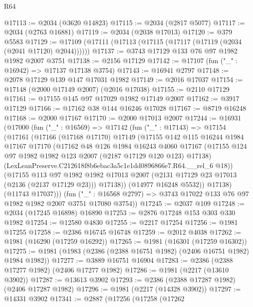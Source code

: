 \begin{lexlean}{R64}
\begin{coremodule}
@17113 := @2034 (@3620 @14823)
@17115 := @2034 (@2817 @5077)
@17117 := @2034 (@2763 @16881)
@17119 := @2034 (@2038 @17013)
@17120 := @379 @5583
@17129 := @17109 (@17111 (@17113 (@17115 (@17117 (@17119 (@2034 (@2041 @17120) @2044))))))
@17137 := @3743 @17129 @133 @76 @97 @1982 @1982 @2007 @3751
@17138 := @2156 @17129
@17142 := @17107 (fun ("_" : @16942) => @17137 @17138 @3754)
@17143 := @16941 @2797
@17148 := @2078 @17129 @139 @147 @17031 @1982
@17149 := @2016 @17037
@17154 := @17148 (@2000 @17149 @2007) (@2016 @17038)
@17155 := @2110 @17129
@17161 := @17155 @145 @97 @17029 @1982 @17149 @2007
@17162 := @3917 @17129
@17166 := @17162 @38 @144 @16246 @17028
@17167 := @8719 @16248
@17168 := @2000 @17167
@17170 := @2000 @17013 @2007
@17244 := @16931
    (@17000
      (fun ("_" : @16569) =>
      @17142
        (fun ("_" : @17143) =>
        @17154
          (@17161
            (@17166
              (@17168 @17170)
              @17149
              (@17155
                @142
                @115
                @16244
                @1984
                @17167
                @17170
                (@17162
                  @48
                  @126
                  @1984
                  @16243
                  @4060
                  @17167
                  (@17155 @124 @97 @1982 @1982 @123 @2007 (@2187 @17129 @120 @123) @17138)
                  (LexLeanPreserve.C212618f8b6ebac3a5c1e1dd0896866e7.R64.__rel_6 @18))
                (@17155
                  @113
                  @97
                  @1982
                  @1982
                  @17013
                  @2007
                  (@2131 @17129 @23 @17013 (@2136 (@2137 @17129 @23)))
                  @17138))
              (@14977 @16248 @5532))
            @17138)
          (@11743 @17037)))
      (fun ("_" : @16568 @2797) => @3743 @17022 @133 @76 @97 @1982 @1982 @2007 @3751 @17080 @3754))
@17245 := @2037 @109
@17248 := @2034 (@17245 @16898) @16890
@17253 := @2876 @17248 @153 @303 @330 @1982
@17254 := @12580 @4830
@17255 := @2217 @17254
@17256 := @1981 @17255
@17258 := @2386 @16745 @16748
@17259 := @2012 @4038
@17262 := @1981 (@16290 (@17259 @16292))
@17265 := @1981 (@16301 (@17259 @16302))
@17275 := @1981 (@1983 (@2386 (@2388 @16751 @1982) (@2406 @16751 @1982) @1984 @1982))
@17277 := @3889 @16751 @16904
@17283 := @2386 (@2388 @17277 @1982) (@2406 @17277 @1982)
@17286 := @1981 (@2217 (@13610 @3902))
@17287 := @13613 @3902
@17293 := @2386 (@2388 @17287 @1982) (@2406 @17287 @1982)
@17296 := @1981 (@2217 (@14328 @3902))
@17297 := @14331 @3902
@17341 := @2887
    (@17256
      (@17258
        (@17262

\end{coremodule}
\end{lexlean}
